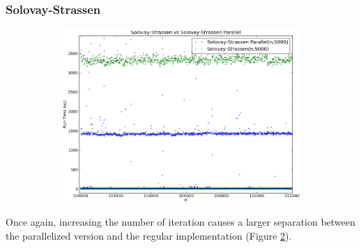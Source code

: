 \documentclass[compressed,final,notitlepage,narroweqnarray,inline,twoside,]{ieee}
\begin{document}
\subsubsection{Solovay-Strassen}
\begin{figure}
        \centering
        \begin{subfigure}[b]{0.533\textwidth}
                \includegraphics[width=\textwidth]{../images/SS_SSP_large_runtime}
                \label{fig:gull}
        \end{subfigure}
        \vspace{-30pt}\caption{}\label{fig:ss_p_comparison_large}
\end{figure}
Once again, increasing the number of iteration causes a larger separation between the parallelized version and the regular implementation (Figure \ref{fig:ss_p_comparison_large}).
\end{document}
